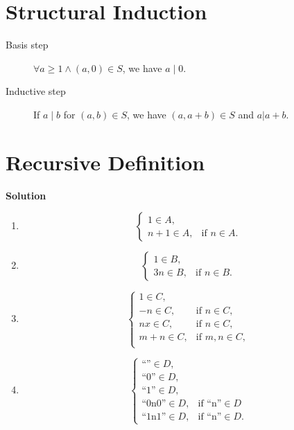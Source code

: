 \documentclass{../../cls/sig-alternate-05-2015}
\begin{document}
\section{Structural Induction}
\begin{description}
    \item[Basis step] $\forall a \ge 1 \land (a, 0) \in S$, we have $a \mid 0$.
    \item[Inductive step] If $a \mid b$ for $(a, b) \in S$, we have $(a, a + b) \in S$ and $a | a + b$.
\end{description}

\section{Recursive Definition}
\textbf{Solution}\begin{enumerate}[label=(\alph*)]
    \item \begin{equation}
        \begin{cases}
        1 \in A, &\\
        n + 1 \in A, & \text{if } n \in A.
        \end{cases}
    \end{equation}
    \item \begin{equation}
    \begin{cases}
    1 \in B, &\\
    3n \in B, & \text{if } n \in B.
    \end{cases}
    \end{equation}
    \item \begin{equation}
        \begin{cases}
        1 \in C, &\\
        -n \in C, & \text{if } n \in C,\\
        nx \in C, & \text{if } n \in C,\\
        m + n \in C, & \text{if } m, n \in C,\\
        \end{cases}
    \end{equation}
    \item \begin{equation}
        \begin{cases}
        \text{``''} \in D, &\\
        \text{``0''} \in D, &\\
        \text{``1''} \in D, &\\
        \text{``0n0''} \in D, & \text{if ``n''} \in D\\
        \text{``1n1''} \in D, & \text{if ``n''} \in D.
        \end{cases}
    \end{equation}
\end{enumerate}
\end{document}
